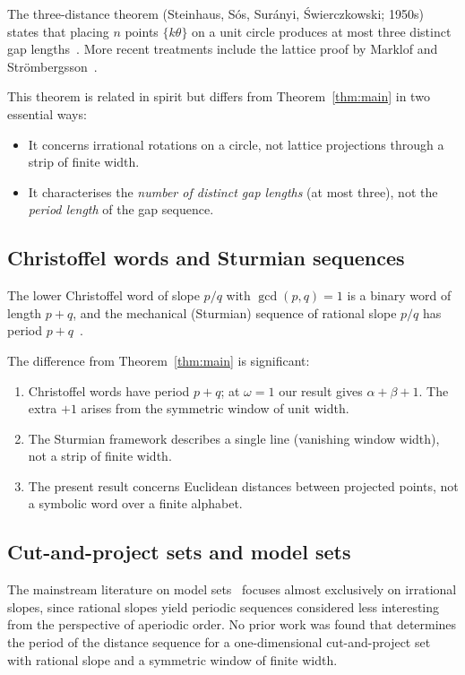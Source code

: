\documentclass[11pt]{article}
\theoremstyle{plain}
\theoremstyle{definition}
\theoremstyle{remark}
\begin{document}
The three-distance theorem (Steinhaus, S\'{o}s, Sur\'{a}nyi,
\'{S}wierczkowski; 1950s) states that placing $n$ points $\{k\theta\}$
on a unit circle produces at most three distinct gap
lengths~\cite{ThreeGap, BertheReutenauer2024}.
More recent treatments include the lattice proof by Marklof and
Str\"{o}mbergsson~\cite{MarklofStrombergsson2017}.

This theorem is related in spirit but differs from
Theorem~\ref{thm:main} in two essential ways:
\begin{itemize}
    \item It concerns irrational rotations on a circle, not lattice
          projections through a strip of finite width.
    \item It characterises the \emph{number of distinct gap lengths}
          (at most three), not the \emph{period length} of the gap sequence.
\end{itemize}

\subsection{Christoffel words and Sturmian sequences}

The lower Christoffel word of slope $p/q$ with $\gcd(p,q)=1$ is a binary
word of length $p+q$, and the mechanical (Sturmian) sequence of rational
slope $p/q$ has period $p+q$~\cite{BerstelEtAl2008}.

The difference from Theorem~\ref{thm:main} is significant:
\begin{enumerate}
    \item Christoffel words have period $p+q$; at $\omega = 1$ our result
          gives $\alpha+\beta+1$.  The extra $+1$ arises from the symmetric
          window of unit width.
    \item The Sturmian framework describes a single line (vanishing window
          width), not a strip of finite width.
    \item The present result concerns Euclidean distances between projected
          points, not a symbolic word over a finite alphabet.
\end{enumerate}

\subsection{Cut-and-project sets and model sets}

The mainstream literature on model sets~\cite{Senechal2009, Meyer1972,
HaynesEtAl2016} focuses almost exclusively on irrational slopes, since
rational slopes yield periodic sequences considered less interesting from
the perspective of aperiodic order.
No prior work was found that determines the period of the distance sequence
for a one-dimensional cut-and-project set with rational slope and a
symmetric window of finite width.
\end{document}
